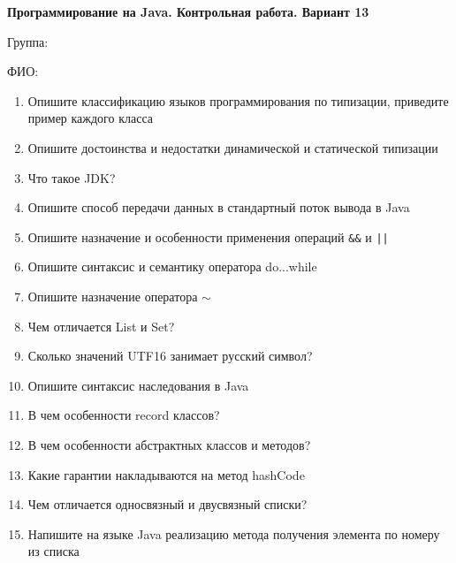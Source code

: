 \documentclass[12pt]{article}
\begin{document}
\newpage\begin{minipage}{\textwidth}
\textbf{Программирование на Java. Контрольная работа. Вариант 13}

Группа: \underline{\hspace{3cm}}

ФИО: \underline{\hspace{10cm}}

\begin{enumerate}
\item Опишите классификацию языков программирования по типизации, приведите пример каждого класса
\item Опишите достоинства и недостатки динамической и статической типизации
\item Что такое JDK?
\item Опишите способ передачи данных в стандартный поток вывода в Java
\item Опишите назначение и особенности применения операций \verb|&&| и \verb!||!
\item Опишите синтаксис и семантику оператора do...while
\item Опишите назначение оператора $\sim$
\item Чем отличается List и Set?
\item Сколько значений UTF16 занимает русский символ?
\item Опишите синтаксис наследования в Java
\item В чем особенности record классов?
\item В чем особенности абстрактных классов и методов?
\item Какие гарантии накладываются на метод hashCode
\item Чем отличается односвязный и двусвязный списки?
\item Напишите на языке Java реализацию метода получения элемента по номеру из списка

\end{enumerate}
\end{minipage}
\end{document}
